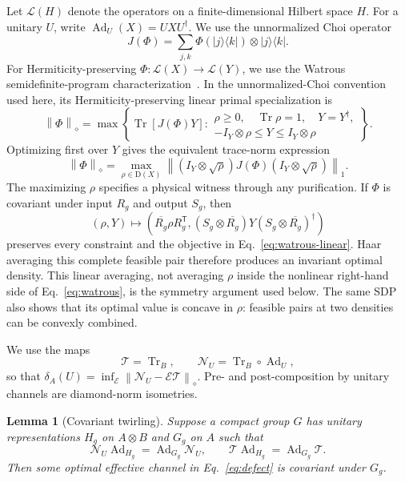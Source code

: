\documentclass[11pt,a4paper]{article}
\newtheorem{lemma}{Lemma}
\theoremstyle{remark}
\newcommand{\Tr}{\operatorname{Tr}}
\newcommand{\Ad}{\operatorname{Ad}}
\newcommand{\cE}{\mathcal{E}}
\newcommand{\cN}{\mathcal{N}}
\newcommand{\cT}{\mathcal{T}}
\newcommand{\cL}{\mathcal{L}}
\newcommand{\diamondnorm}[1]{\left\lVert #1\right\rVert_{\diamond}}
\newcommand{\tracenorm}[1]{\left\lVert #1\right\rVert_{1}}
\begin{document}
Let $\cL(H)$ denote the operators on a finite-dimensional Hilbert space $H$.
For a unitary $U$, write $\Ad_U(X)=UXU^\dagger$.  We use the unnormalized Choi
operator
\[
 J(\Phi)=\sum_{j,k}\Phi(|j\rangle\langle k|)
                 \otimes |j\rangle\langle k|.
\]
For Hermiticity-preserving $\Phi:\cL(X)\to\cL(Y)$, we use the Watrous
semidefinite-program characterization~\cite{watrous2009,watrous2018}.
In the unnormalized-Choi convention used here, its Hermiticity-preserving
linear primal specialization is
\begin{equation}
 \diamondnorm{\Phi}
 =\max\left\{\Tr[J(\Phi)Y]:
 \begin{array}{l}
  \rho\geq0,\quad \Tr\rho=1,\quad Y=Y^\dagger,\\
  -I_Y\otimes\rho\leq Y\leq I_Y\otimes\rho
 \end{array}\right\}.
 \label{eq:watrous-linear}
\end{equation}
Optimizing first over $Y$ gives the equivalent trace-norm expression
\begin{equation}
 \diamondnorm{\Phi}
 =\max_{\rho\in\mathrm{D}(X)}
 \tracenorm{(I_Y\otimes\sqrt{\rho})J(\Phi)
                     (I_Y\otimes\sqrt{\rho})}.
 \label{eq:watrous}
\end{equation}
The maximizing $\rho$ specifies a physical witness through any purification.
If $\Phi$ is covariant under input $R_g$ and output $S_g$, then
\[
 (\rho,Y)\longmapsto
 \left(\overline{R_g}\rho R_g^{\mathsf T},
 (S_g\otimes\overline{R_g})Y
 (S_g\otimes\overline{R_g})^\dagger\right)
\]
preserves every constraint and the objective in
Eq.~\eqref{eq:watrous-linear}.  Haar averaging this complete feasible pair
therefore produces an invariant optimal density.  This linear averaging, not
averaging $\rho$ inside the nonlinear right-hand side of
Eq.~\eqref{eq:watrous}, is the symmetry argument used below.  The same SDP
also shows that its optimal value is concave in $\rho$: feasible pairs at two
densities can be convexly combined.

We use the maps
\[
 \cT=\Tr_B,\qquad \cN_U=\Tr_B\circ\Ad_U,
\]
so that $\delta_A(U)=\inf_\cE\diamondnorm{\cN_U-\cE\cT}$.
Pre- and post-composition by unitary channels are diamond-norm isometries.

\begin{lemma}[Covariant twirling]
\label{lem:twirl}
Suppose a compact group $G$ has unitary representations $H_g$ on $A\otimes B$
and $G_g$ on $A$ such that
\[
 \cN_U\Ad_{H_g}=\Ad_{G_g}\cN_U,\qquad
 \cT\Ad_{H_g}=\Ad_{G_g}\cT.
\]
Then some optimal effective channel in Eq.~\eqref{eq:defect} is covariant under
$G_g$.
\end{lemma}
\end{document}
